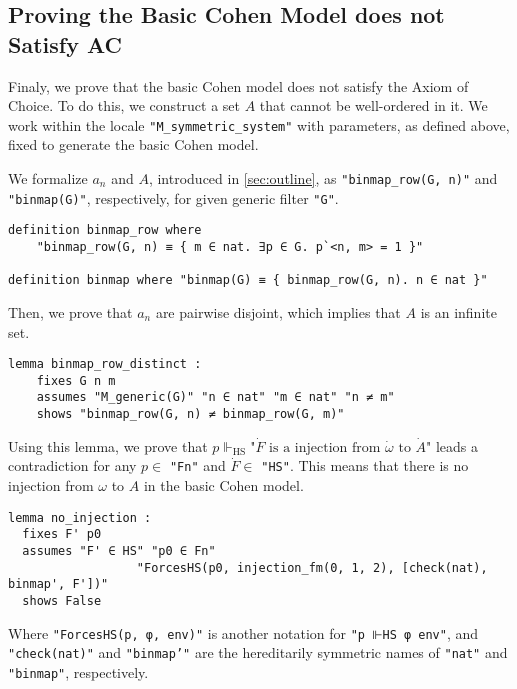 \documentclass{report}
\newenvironment{isaframe}{\begin{mdframed}[topline=false, rightline=false, bottomline=false]}{\end{mdframed}}
\begin{document}
\subsection{Proving the Basic Cohen Model does not Satisfy AC}
Finaly, we prove that the basic Cohen model does not satisfy the Axiom of Choice.
To do this, we construct a set $A$ that cannot be well-ordered in it.
We work within the locale \texttt{"M\_symmetric\_system"} with parameters, as defined above, 
fixed to generate the basic Cohen model.

We formalize $a_n$ and $A$, introduced in \cref{sec:outline}, 
as \texttt{"binmap\_row(G, n)"} and \texttt{"binmap(G)"}, respectively, for given generic filter \texttt{"G"}.
\begin{isaframe}
\begin{verbatim}
definition binmap_row where 
    "binmap_row(G, n) ≡ { m ∈ nat. ∃p ∈ G. p`<n, m> = 1 }"

definition binmap where "binmap(G) ≡ { binmap_row(G, n). n ∈ nat }" 
\end{verbatim}
\end{isaframe}
Then, we prove that $a_n$ are pairwise disjoint, which implies that $A$ is an infinite set.
\begin{isaframe}
\begin{verbatim}
lemma binmap_row_distinct : 
    fixes G n m 
    assumes "M_generic(G)" "n ∈ nat" "m ∈ nat" "n ≠ m" 
    shows "binmap_row(G, n) ≠ binmap_row(G, m)" 
\end{verbatim}
\end{isaframe}
Using this lemma, we prove that 
$p \Vdash_{\mathrm{HS}} \text{"} \dot{F} \text{ is a injection from } \dot{\omega} \text{ to } \dot{A} \text{"}$ leads a contradiction 
for any $p \in $ \texttt{"Fn"} and $\dot{F} \in $ \texttt{"HS"}.
This means that there is no injection from $\omega$ to $A$ in the basic Cohen model.
\begin{isaframe}
\begin{verbatim}
lemma no_injection : 
  fixes F' p0
  assumes "F' ∈ HS" "p0 ∈ Fn"  
                  "ForcesHS(p0, injection_fm(0, 1, 2), [check(nat), binmap', F'])" 
  shows False
\end{verbatim}
\end{isaframe}
Where \texttt{"ForcesHS(p, φ, env)"} is another notation for \texttt{"p ⊩HS φ env"},
and \texttt{"check(nat)"} and \texttt{"binmap'"} are the hereditarily symmetric names of \texttt{"nat"} and \texttt{"binmap"}, respectively.
\end{document}
